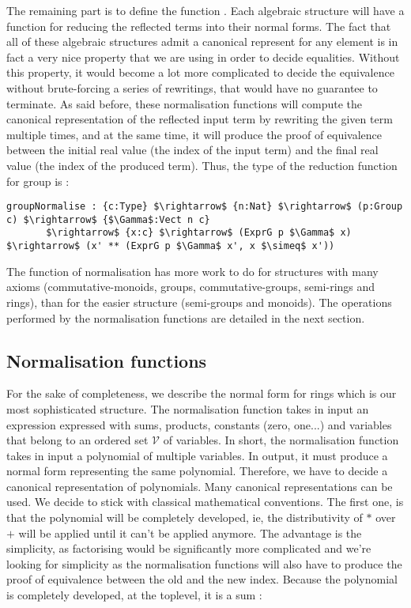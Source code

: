 The remaining part is to define the function . Each algebraic structure will have a function for reducing the reflected terms into their normal forms. The fact that all of these algebraic structures admit a canonical represent for any element is in fact a very nice property that we are using in order to decide equalities. Without this property, it would become a lot more complicated to decide the equivalence without brute-forcing a series of rewritings, that would have no guarantee to terminate.
As said before, these normalisation functions will compute the canonical representation of the reflected input term by rewriting the given term multiple times, and at the same time, it will produce the proof of equivalence between the initial real value (the index of the input term) and the final real value (the index of the produced term). Thus, the type of the reduction function for group is :


\begin{lstlisting}
groupNormalise : {c:Type} $\rightarrow$ {n:Nat} $\rightarrow$ (p:Group c) $\rightarrow$ {$\Gamma$:Vect n c} 
       $\rightarrow$ {x:c} $\rightarrow$ (ExprG p $\Gamma$ x) $\rightarrow$ (x' ** (ExprG p $\Gamma$ x', x $\simeq$ x'))
\end{lstlisting}


The function of normalisation has more work to do for structures with many axioms (commutative-monoids, groups, commutative-groups, semi-rings and rings), than for the easier structure (semi-groups and monoids).
The operations performed by the normalisation functions are detailed in the next section.


\subsection{Normalisation functions}
\label{sect:normalFormShape}

For the sake of completeness, we describe the normal form for rings which is our most sophisticated structure.
The normalisation function takes in input an expression expressed with sums, products, constants (zero, one...) and variables that belong to an ordered set $\mathcal{V}$ of variables. In short, the normalisation function takes in input a polynomial of multiple variables. In output, it must produce a normal form representing the same polynomial. Therefore, we have to decide a canonical representation of polynomials. Many canonical representations can be used. We decide to stick with classical mathematical conventions. The first one, is that the polynomial will be completely developed, ie, the distributivity of $*$ over $+$ will be applied until it can't be applied anymore. The advantage is the simplicity, as factorising would be significantly more complicated and we're looking for simplicity as the normalisation functions will also have to produce the proof of equivalence between the old and the new index. Because the polynomial is completely developed, at the toplevel, it is a sum :

